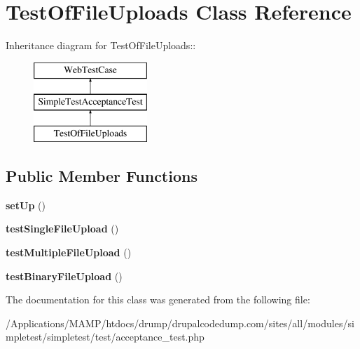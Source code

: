 \hypertarget{class_test_of_file_uploads}{
\section{TestOfFileUploads Class Reference}
\label{class_test_of_file_uploads}
}
Inheritance diagram for TestOfFileUploads::\begin{figure}[H]
\begin{center}
\leavevmode
\includegraphics[height=3cm]{class_test_of_file_uploads}
\end{center}
\end{figure}
\subsection*{Public Member Functions}
\begin{DoxyCompactItemize}
\item 
\hypertarget{class_test_of_file_uploads_aed09de3d701433b61a589663a6ac58b9}{
{\bfseries setUp} ()}
\label{class_test_of_file_uploads_aed09de3d701433b61a589663a6ac58b9}

\item 
\hypertarget{class_test_of_file_uploads_a28528b66b0fd8d2d34073986ba916214}{
{\bfseries testSingleFileUpload} ()}
\label{class_test_of_file_uploads_a28528b66b0fd8d2d34073986ba916214}

\item 
\hypertarget{class_test_of_file_uploads_af4a8fb5080e407123f7b793408c8479e}{
{\bfseries testMultipleFileUpload} ()}
\label{class_test_of_file_uploads_af4a8fb5080e407123f7b793408c8479e}

\item 
\hypertarget{class_test_of_file_uploads_ab41ea45619af25afb049dc16ac9b8579}{
{\bfseries testBinaryFileUpload} ()}
\label{class_test_of_file_uploads_ab41ea45619af25afb049dc16ac9b8579}

\end{DoxyCompactItemize}


The documentation for this class was generated from the following file:\begin{DoxyCompactItemize}
\item 
/Applications/MAMP/htdocs/drump/drupalcodedump.com/sites/all/modules/simpletest/simpletest/test/acceptance\_\-test.php\end{DoxyCompactItemize}
